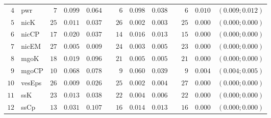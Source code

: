 \begin{table*}[!htbp]
\begin{tabular}{@{}rlrrrrrrrrrcc@{}}
\footnotesize{$4 $} & \footnotesize{pwr      } & \footnotesize{$7 $} & \footnotesize{$0.099$} & \footnotesize{$0.064$} && \footnotesize{$6 $} & \footnotesize{$0.098$} & \footnotesize{$0.038$} && \footnotesize{$6 $} & \footnotesize{$0.010$} & \footnotesize{$(0.009;0.012)$} \\
\footnotesize{$5 $} & \footnotesize{nicK     } & \footnotesize{$25$} & \footnotesize{$0.011$} & \footnotesize{$0.037$} && \footnotesize{$26$} & \footnotesize{$0.002$} & \footnotesize{$0.003$} && \footnotesize{$25$} & \footnotesize{$0.000$} & \footnotesize{$(0.000;0.000)$} \\
\footnotesize{$6 $} & \footnotesize{nicCP    } & \footnotesize{$17$} & \footnotesize{$0.020$} & \footnotesize{$0.037$} && \footnotesize{$14$} & \footnotesize{$0.016$} & \footnotesize{$0.013$} && \footnotesize{$15$} & \footnotesize{$0.000$} & \footnotesize{$(0.000;0.000)$} \\
\footnotesize{$7 $} & \footnotesize{nicEM    } & \footnotesize{$27$} & \footnotesize{$0.005$} & \footnotesize{$0.009$} && \footnotesize{$24$} & \footnotesize{$0.003$} & \footnotesize{$0.005$} && \footnotesize{$23$} & \footnotesize{$0.000$} & \footnotesize{$(0.000;0.000)$} \\
\footnotesize{$8 $} & \footnotesize{mgoK     } & \footnotesize{$18$} & \footnotesize{$0.019$} & \footnotesize{$0.096$} && \footnotesize{$21$} & \footnotesize{$0.005$} & \footnotesize{$0.005$} && \footnotesize{$21$} & \footnotesize{$0.000$} & \footnotesize{$(0.000;0.000)$} \\
\footnotesize{$9 $} & \footnotesize{mgoCP    } & \footnotesize{$10$} & \footnotesize{$0.068$} & \footnotesize{$0.078$} && \footnotesize{$9 $} & \footnotesize{$0.060$} & \footnotesize{$0.039$} && \footnotesize{$9 $} & \footnotesize{$0.004$} & \footnotesize{$(0.004;0.005)$} \\
\footnotesize{$10$} & \footnotesize{vesEps   } & \footnotesize{$26$} & \footnotesize{$0.009$} & \footnotesize{$0.026$} && \footnotesize{$25$} & \footnotesize{$0.002$} & \footnotesize{$0.004$} && \footnotesize{$27$} & \footnotesize{$0.000$} & \footnotesize{$(0.000;0.000)$} \\
\footnotesize{$11$} & \footnotesize{ssK      } & \footnotesize{$23$} & \footnotesize{$0.013$} & \footnotesize{$0.038$} && \footnotesize{$22$} & \footnotesize{$0.004$} & \footnotesize{$0.006$} && \footnotesize{$22$} & \footnotesize{$0.000$} & \footnotesize{$(0.000;0.000)$} \\
\footnotesize{$12$} & \footnotesize{ssCp     } & \footnotesize{$13$} & \footnotesize{$0.031$} & \footnotesize{$0.107$} && \footnotesize{$16$} & \footnotesize{$0.014$} & \footnotesize{$0.013$} && \footnotesize{$16$} & \footnotesize{$0.000$} & \footnotesize{$(0.000;0.000)$} \\

\end{tabular}
\end{table*}
